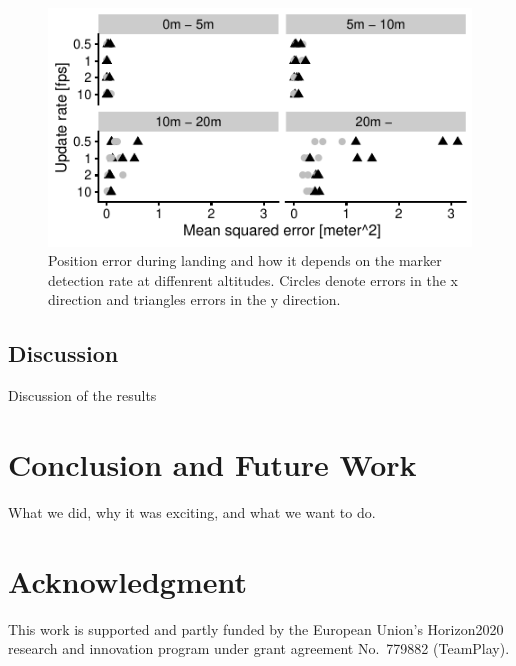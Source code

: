 \documentclass[conference]{IEEEtran}
\begin{document}
\begin{figure}[h]
\centering
\includegraphics{data_visualization/QoSLanding.pdf}
\caption{Position error during landing and how it depends 
on the marker detection rate at diffenrent altitudes.
Circles denote errors in the x direction and triangles 
errors in the y direction.}
\label{fig:PositionErrorDuringLanding}
\end{figure}



\subsection{Discussion}

Discussion of the results

\section{Conclusion and Future Work}
\label{sec:conclusion}

What we did, why it was exciting, and what we want to do.

\section*{Acknowledgment}

This work is supported and partly funded by the European Union’s
Horizon2020 research and innovation program under grant agreement
No.~779882 (TeamPlay).


 
\vspace{1ex}
\end{document}
